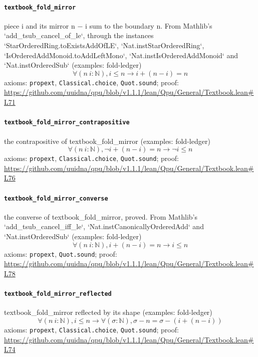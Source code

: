 \documentclass[11pt]{article}
\begin{document}
\paragraph{\texttt{textbook\_fold\_mirror}}
piece i and its mirror n − i sum to the boundary n. From Mathlib's `add\_tsub\_cancel\_of\_le`, through the instances `StarOrderedRing.toExistsAddOfLE`, `Nat.instStarOrderedRing`, `IsOrderedAddMonoid.toAddLeftMono`, `Nat.instIsOrderedAddMonoid` and `Nat.instOrderedSub` (examples: fold-ledger)
\[ \forall (n\ i : \mathbb{N}), i \le n \to i + (n - i) = n \]
\noindent axioms: \texttt{propext}, \texttt{Classical.choice}, \texttt{Quot.sound}; proof: \url{https://github.com/uuidna/qpu/blob/v1.1.1/lean/Qpu/General/Textbook.lean\#L71}

\paragraph{\texttt{textbook\_fold\_mirror\_contrapositive}}
the contrapositive of textbook\_fold\_mirror (examples: fold-ledger)
\[ \forall (n\ i : \mathbb{N}), \neg i + (n - i) = n \to \neg i \le n \]
\noindent axioms: \texttt{propext}, \texttt{Classical.choice}, \texttt{Quot.sound}; proof: \url{https://github.com/uuidna/qpu/blob/v1.1.1/lean/Qpu/General/Textbook.lean\#L76}

\paragraph{\texttt{textbook\_fold\_mirror\_converse}}
the converse of textbook\_fold\_mirror, proved. From Mathlib's `add\_tsub\_cancel\_iff\_le`, `Nat.instCanonicallyOrderedAdd` and `Nat.instOrderedSub` (examples: fold-ledger)
\[ \forall (n\ i : \mathbb{N}), i + (n - i) = n \to i \le n \]
\noindent axioms: \texttt{propext}, \texttt{Quot.sound}; proof: \url{https://github.com/uuidna/qpu/blob/v1.1.1/lean/Qpu/General/Textbook.lean\#L78}

\paragraph{\texttt{textbook\_fold\_mirror\_reflected}}
textbook\_fold\_mirror reflected by its shape (examples: fold-ledger)
\[ \forall (n\ i : \mathbb{N}), i \le n \to \forall (\sigma : \mathbb{N}), \sigma - n = \sigma - (i + (n - i)) \]
\noindent axioms: \texttt{propext}, \texttt{Classical.choice}, \texttt{Quot.sound}; proof: \url{https://github.com/uuidna/qpu/blob/v1.1.1/lean/Qpu/General/Textbook.lean\#L74}
\end{document}
